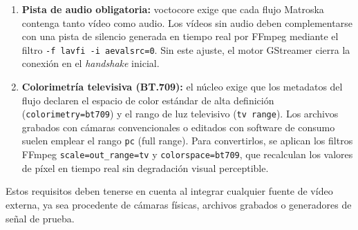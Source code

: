 \begin{enumerate}
  \item \textbf{Pista de audio obligatoria:} voctocore exige que cada flujo Matroska
        contenga tanto vídeo como audio. Los vídeos sin audio deben complementarse con
        una pista de silencio generada en tiempo real por FFmpeg mediante el filtro
        \texttt{-f lavfi -i aevalsrc=0}. Sin este ajuste, el motor GStreamer cierra la
        conexión en el \textit{handshake} inicial.
  \item \textbf{Colorimetría televisiva (BT.709):} el núcleo exige que los metadatos
        del flujo declaren el espacio de color estándar de alta definición
        (\texttt{colorimetry=bt709}) y el rango de luz televisivo (\texttt{tv range}).
        Los archivos grabados con cámaras convencionales o editados con software de
        consumo suelen emplear el rango \texttt{pc} (full range). Para convertirlos, se
        aplican los filtros FFmpeg \texttt{scale=out\_range=tv} y
        \texttt{colorspace=bt709}, que recalculan los valores de píxel en tiempo real
        sin degradación visual perceptible.
\end{enumerate}

Estos requisitos deben tenerse en cuenta al integrar cualquier fuente de vídeo externa,
ya sea procedente de cámaras físicas, archivos grabados o generadores de señal de prueba.

